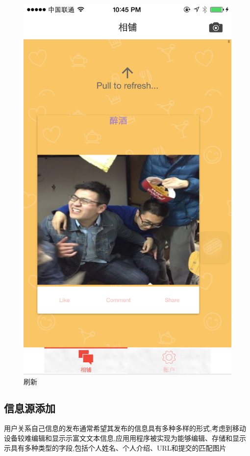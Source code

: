 \begin{figure}[h]
\begin{minipage}[t]{0.3\linewidth}
\includegraphics[width=\textwidth]{img/chap4/info3.PNG}
\caption{刷新\label{snapchat}}
\end{minipage}
\hfill
\end{figure}

\subsection{信息源添加}
用户关系自己信息的发布通常希望其发布的信息具有多种多样的形式,考虑到移动设备较难编辑和显⽰示富⽂文本信息,应⽤用程序被实现为能够编辑、存储和显⽰示具有多种类型的字段,包括个人姓名、个人介绍、URL和提交的匹配图片

